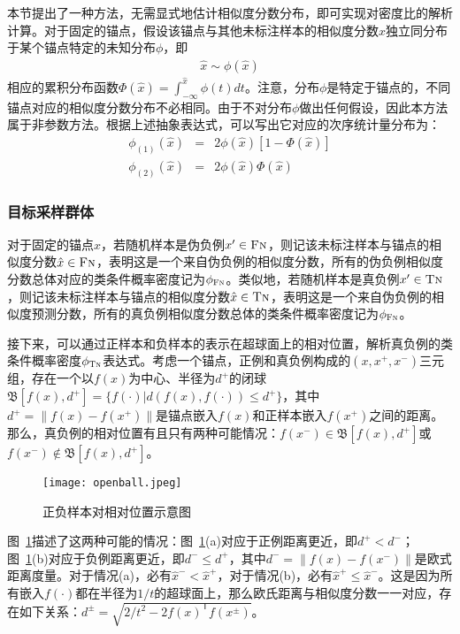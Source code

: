 本节提出了一种方法，无需显式地估计相似度分数分布，即可实现对密度比的解析计算。对于固定的锚点，假设该锚点与其他未标注样本的相似度分数$\hat{x}$独立同分布于某个锚点特定的未知分布$\phi$，即
\begin{eqnarray}
\hat{x} \sim \phi(\hat{x})
\end{eqnarray}
相应的累积分布函数$\Phi(\hat{x})=\int_{-\infty}^{\hat{x}} \phi(t) dt$。注意，分布$\phi$是特定于锚点的，不同锚点对应的相似度分数分布不必相同。由于不对分布$\phi$做出任何假设，因此本方法属于非参数方法。根据上述抽象表达式，可以写出它对应的次序统计量分布为：
\begin{eqnarray}
	\phi_{(1)}(\hat{x}) &=& 2\phi(\hat{x}) [1-\Phi(\hat{x})] \label{eq:order1} \\
	\phi_{(2)}(\hat{x}) &=& 2\phi(\hat{x}) \Phi(\hat{x}) \label{eq:order2}
\end{eqnarray}

\subsubsection{目标采样群体}
对于固定的锚点$x$，若随机样本是伪负例$x^\prime\in \textsc{Fn}$，则记该未标注样本与锚点的相似度分数$\hat{x} \in \textsc{Fn}$，表明这是一个来自伪负例的相似度分数，所有的伪负例相似度分数总体对应的类条件概率密度记为$\phi_\textsc{Fn}$。类似地，若随机样本是真负例$x^\prime\in \textsc{Tn}$，则记该未标注样本与锚点的相似度分数$\hat{x} \in \textsc{Tn}$，表明这是一个来自伪负例的相似度预测分数，所有的真负例相似度分数总体的类条件概率密度记为$\phi_\textsc{Fn}$。

接下来，可以通过正样本和负样本的表示在超球面上的相对位置，解析真负例的类条件概率密度$\phi_{\textsc{Tn}}$表达式。考虑一个锚点，正例和真负例构成的$(x, x^+, x^-)$三元组，存在一个以$ f(x) $为中心、半径为$ d^+ $的闭球$ \mathfrak{B}[f(x),d^+] =\{f(\cdot)| d(f(x),f(\cdot)) \leq d^+ \}$，其中$ d^+ = \|f(x)-f(x^+)\|$是锚点嵌入$ f(x) $和正样本嵌入$ f(x^+) $之间的距离。那么，真负例的相对位置有且只有两种可能情况：$ f(x^-) \in \mathfrak{B}[f(x),d^+] $或$ f(x^-) \notin \mathfrak{B}[f(x),d^+] $。
\begin{figure}[!]
	\centering
	\texttt{[image: openball.jpeg]}
	\caption{正负样本对相对位置示意图}
	\label{Fig:openball}
\end{figure}
图~\ref{Fig:openball}描述了这两种可能的情况：图~\ref{Fig:openball}(a)对应于正例距离更近，即$ d^+ < d^- $；图~\ref{Fig:openball}(b)对应于负例距离更近，即$ d^- \leq d^+ $，其中$ d^{-}=\|f(x) - f(x^-)\|$是欧式距离度量。对于情况(a)，必有$ \hat{x}^- < \hat{x}^+ $，对于情况(b)，必有$ \hat{x}^+ \leq \hat{x}^- $。这是因为所有嵌入$ f(\cdot) $都在半径为$ 1/t $的超球面上，那么欧氏距离与相似度分数一一对应，存在如下关系：$ d^\pm = \sqrt{2/t^2 - 2f(x)^\mathsf{T} f(x^\pm)}$。

